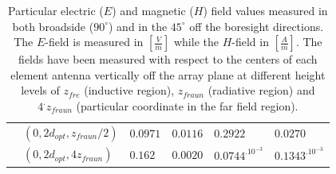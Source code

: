 \documentclass[10pt,a4paper,twocolumn]{article}
\begin{document}
{\begin{table}[bt!]
\begin{center}
{\begin{tabular}{||m{4cm}|m{2.6cm}|m{2cm}|m{2cm}|m{2.3cm}|m{2.3cm}||}
				\cellcolor{pink} & $(0,2d_{opt},z_{fraun}/2)$&$0.0971$ & $0.0116$&$0.2922$ & $0.0270$\\ 
					\cellcolor{pink} & $(0,2d_{opt},4z_{fraun})$& $0.162$ & $0.0020$ & $0.0744^.10^{-3}$&$0.1343^.10^{-3}$ \\
				\hline
		\end{tabular}}
		\caption{Particular electric ($E$) and magnetic ($H$) field values measured in both broadside ($90^\circ$) and in the $45^\circ$ off the boresight directions. The $E$-field is measured in $\left[\frac{V}{m}\right]$ while the $H$-field in $\left[\frac{A}{m}\right]$. The fields have been measured with respect to the centers of each element antenna vertically off the array plane at different height levels of $z_{fre}$ (inductive region), $z_{fraun}$ (radiative region) and $4^.z_{fraun}$ (particular coordinate in the far field region).}  
		\label{table:EH fields}
	\end{center}
\end{table} 



}
\end{document}
